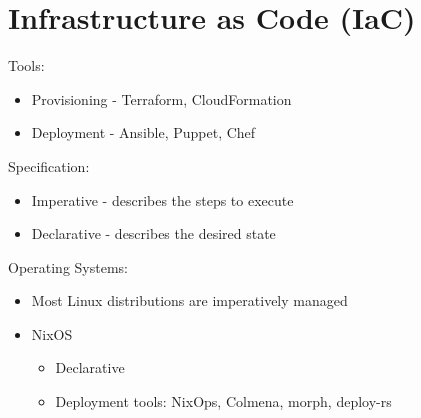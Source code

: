 \hypertarget{infrastructure-as-code-iac}{%
\chapter{Infrastructure as Code
(IaC)}\label{infrastructure-as-code-iac}}

Tools:

\begin{itemize}
\tightlist
\item
  Provisioning - Terraform, CloudFormation
\item
  Deployment - Ansible, Puppet, Chef
\end{itemize}

Specification:

\begin{itemize}
\tightlist
\item
  Imperative - describes the steps to execute
\item
  Declarative - describes the desired state
\end{itemize}

Operating Systems:

\begin{itemize}
\tightlist
\item
  Most Linux distributions are imperatively managed
\item
  NixOS

  \begin{itemize}
  \tightlist
  \item
    Declarative
  \item
    Deployment tools: NixOps, Colmena, morph, deploy-rs
  \end{itemize}
\end{itemize}
